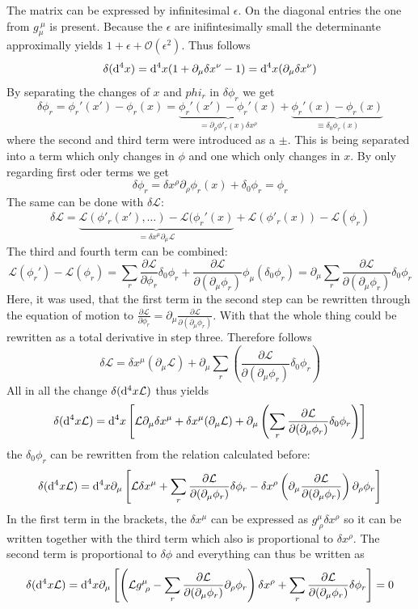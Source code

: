 \documentclass{include/thesisclass}
\newcommand{\LL}{\mathcal{L}}
\newcommand{\dd}{{\rm d}}
\newcommand{\p}{\partial}
\newcommand{\OO}{\mathcal{O}}
\newcommand{\eps}{\epsilon}
\begin{document}
The matrix can be expressed by infinitesimal $\epsilon$. On the diagonal entries the one from $g_\mu^{~\mu}$ is present. Because the $\eps$ are inifintesimally small the determinante approximally yields $1 + \eps + \OO(\eps^2)$. Thus follows
\[ \delta(\dd^4 x) = \dd^4x( 1+ \p_\mu \delta x^\nu -1) = \dd^4x( \p_\mu \delta x^\nu)\]
By separating the changes of $x$ and $phi_r$ in $\delta \phi_r$ we get
\[ \delta \phi_r = \phi_r'(x') - \phi_r(x) = \underbrace{\phi_r'(x') - \phi_r'(x)}_{=\p_\rho \phi'_r(x) \delta x^\rho} + \underbrace{\phi_r'(x) - \phi_r(x)}_{\equiv \delta_0 \phi_r(x)} \]
where the second and third term were introduced as a $\pm$. This is being separated into a term which only changes in $\phi$ and one which only changes in $x$. By only regarding first oder terms we get
\[ \delta \phi_r = \delta x^\rho \p_\rho \phi_r(x) + \delta_0 \phi_r = \phi_r\]
The same can be done with $\delta \LL$:
\[ \delta \LL = \underbrace{ \LL( \phi'_r(x'), \ldots) - \LL(\phi_r'(x)}_{= \delta x^\mu \p_\mu \LL}+ \LL(\phi'_r(x)) - \LL(\phi_r) \]
The third and fourth term can be combined:
\[ \LL(\phi_r') - \LL(\phi_r) = \sum_r \frac{ \p \LL}{\p \phi_r} \delta_0 \phi_r + \frac{\p \LL}{\p (\p_\mu \phi_r)} \phi_\mu ( \delta_0 \phi_r) = \p_\mu \sum_r \frac{\p \LL}{\p ( \p_\mu \phi_r)} \delta_0 \phi_r\]
Here, it was used, that the first term in the second step can be rewritten through the equation of motion to $\frac{\p \LL}{\p \phi_r} = \p_\mu \frac{\p \LL}{\p ( \p_\mu \phi_r)}$. With that the whole thing could be rewritten as a total derivative in step three. Therefore follows
\[ \delta \LL = \delta x^\mu ( \p_\mu \LL) + \p_\mu \sum_r \left( \frac{\p \LL}{\p( \p_\mu \phi_r) } \delta_0 \phi_r\right)\]
All in all the change $\delta( \dd^4 x \LL)$ thus yields
\[ \delta( \dd^4 x\LL) = \dd^4 x \left[ \LL \p_\mu \delta x^\mu + \delta x^\mu ( \p_\mu \LL) + \p_\mu \left( \sum_r \frac{\p \LL}{\p( \p_\mu \phi_r)} \delta_0 \phi_r \right)\right]\]
the $\delta_0 \phi_r$ can be rewritten from the relation calculated before:
\[ \delta( \dd^4 x \LL) = \dd^4 x \p_\mu\left[ \LL \delta x^\mu + \sum_r \frac{\p \LL}{\p (\p_\mu \phi_r)} \delta\phi_r - \delta x^\rho \left( \p_\mu \frac{\p \LL}{\p ( \p_\mu \phi_r)} \right) \p_\rho \phi_r\right]\]
In the first term in the brackets, the $\delta x^\mu$ can be expressed as $g^\mu_{~\rho} \delta x^\rho$ so it can be written together with the third term which also is proportional to $\delta x^\rho$. The second term is proportional to $\delta \phi$ and everything can thus be written as
\[ \delta( \dd^4 x \LL) = \dd^4x \p_\mu \left[ \left( \LL g^\mu _{~\rho} - \sum_r \frac{\p \LL}{\p ( \p_\mu \phi_r)} \p_\rho \phi_r \right) \delta x^\rho + \sum_r \frac{\p \LL}{\p ( \p_\mu \phi_r)} \delta \phi_r \right]  = 0\]
\end{document}
